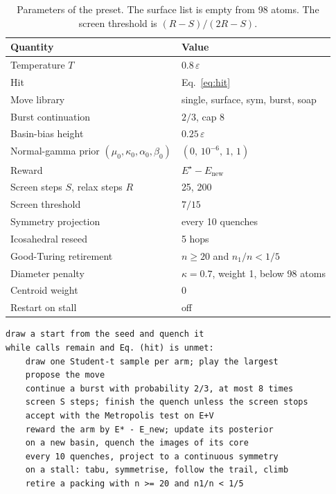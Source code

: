 \documentclass[aip,jcp,preprint,amsmath,amssymb,floatfix]{revtex4-2}
\begin{document}
\begin{table}
\caption{Parameters of the preset.
The surface list is empty from 98 atoms.
The screen threshold is \((R-S)/(2R-S)\).}
\label{tab:params}
\begin{ruledtabular}
\begin{tabular}{ll}
Quantity & Value \\
\hline
Temperature \(T\) & \(0.8\,\varepsilon\) \\
Hit & Eq.~\eqref{eq:hit} \\
Move library & single, surface, sym, burst, soap \\
Burst continuation & \(2/3\), cap 8 \\
Basin-bias height & \(0.25\,\varepsilon\) \\
Normal-gamma prior \((\mu_0,\kappa_0,\alpha_0,\beta_0)\) & \((0,\,10^{-6},\,1,\,1)\) \\
Reward & \(E^{\star}-E_{\mathrm{new}}\) \\
Screen steps \(S\), relax steps \(R\) & 25, 200 \\
Screen threshold & \(7/15\) \\
Symmetry projection & every 10 quenches \\
Icosahedral reseed & 5 hops \\
Good-Turing retirement & \(n\ge 20\) and \(n_1/n<1/5\) \\
Diameter penalty & \(\kappa=0.7\), weight 1, below 98 atoms \\
Centroid weight & 0 \\
Restart on stall & off \\
\end{tabular}
\end{ruledtabular}
\end{table}

\begin{verbatim}
draw a start from the seed and quench it
while calls remain and Eq. (hit) is unmet:
    draw one Student-t sample per arm; play the largest
    propose the move
    continue a burst with probability 2/3, at most 8 times
    screen S steps; finish the quench unless the screen stops
    accept with the Metropolis test on E+V
    reward the arm by E* - E_new; update its posterior
    on a new basin, quench the images of its core
    every 10 quenches, project to a continuous symmetry
    on a stall: tabu, symmetrise, follow the trail, climb
    retire a packing with n >= 20 and n1/n < 1/5
\end{verbatim}
\end{document}
